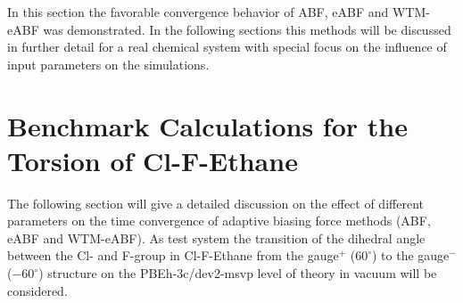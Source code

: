 In this section the favorable convergence behavior of ABF, eABF and WTM-eABF was demonstrated.
In the following sections this methods will be discussed in further detail for a real chemical system with special focus on the influence of input parameters on the simulations.

\newpage
\section{Benchmark Calculations for the Torsion of Cl-F-Ethane}
\label{sec:test}
The following section will give a detailed discussion on the effect of different parameters on the time convergence of adaptive biasing force methods (ABF, eABF and WTM-eABF).
As test system the transition of the dihedral angle between the Cl- and F-group in Cl-F-Ethane from the gauge$^+$ ($60^\circ$) to the gauge$^-$ ($-60^\circ$) structure on the PBEh-3c/dev2-msvp level of theory in vacuum will be considered.

